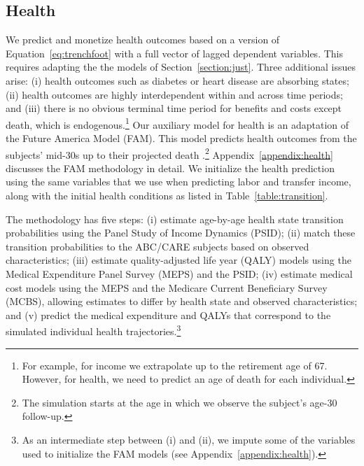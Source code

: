 \subsection{Health} \label{section:health}

 We predict and monetize health outcomes based on a version of Equation~\eqref{eq:trenchfoot} with a full vector of lagged dependent variables. This requires adapting the the models of Section~\ref{section:just}. Three additional issues arise: (i) health outcomes such as diabetes or heart disease are absorbing states; (ii) health outcomes are highly interdependent within and across time periods; and (iii) there is no obvious terminal time period for benefits and costs except death, which is endogenous.\footnote{For example, for income we extrapolate up to the retirement age of 67. However, for health, we need to predict an age of death for each individual.} Our auxiliary model for health is an adaptation of the Future America Model (FAM). This model predicts health outcomes from the subjects' mid-30s up to their projected death \citep{Goldman_etal_2015_Future-Elderly-Model-Report}.\footnote{The simulation starts at the age in which we observe the subject's age-30 follow-up.} Appendix~\ref{appendix:health} discusses the FAM methodology in detail. We initialize the health prediction using the same variables that we use when predicting labor and transfer income, along with the initial health conditions as listed in Table~\ref{table:transition}.

The methodology has five steps: (i) estimate age-by-age health state transition probabilities using the Panel Study of Income Dynamics (PSID); (ii) match these transition probabilities to the ABC/CARE subjects based on observed characteristics; (iii) estimate quality-adjusted life year (QALY) models using the Medical Expenditure Panel Survey (MEPS) and the PSID; (iv) estimate medical cost models using the MEPS and the Medicare Current Beneficiary Survey (MCBS), allowing estimates to differ by health state and observed characteristics; and (v) predict the medical expenditure and QALYs that correspond to the simulated individual health trajectories.\footnote{As an intermediate step between (i) and (ii), we impute some of the variables used to initialize the FAM models (see Appendix~\ref{appendix:health}).}

